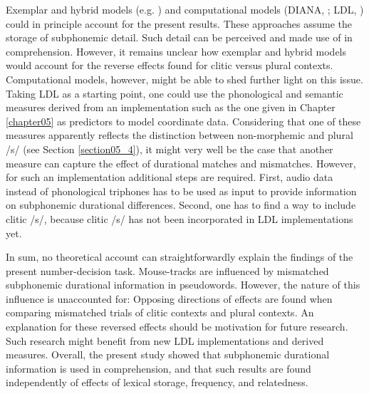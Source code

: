 Exemplar and hybrid models (e.g. \cite{Goldinger1996, Hawkins2001, Pierrehumbert2002, Hanique2013Aalders}) and computational models (DIANA, \cite{tenBosch2015, tenBosch2021}; LDL, \cite{Baayen2019}) could in principle account for the present results. These approaches assume the storage of subphonemic detail. Such detail can be perceived and made use of in comprehension. However, it remains unclear how exemplar and hybrid models would account for the reverse effects found for clitic versus plural contexts. Computational models, however, might be able to shed further light on this issue. Taking LDL as a starting point, one could use the phonological and semantic measures derived from an implementation such as the one given in Chapter \ref{chapter05} as predictors to model coordinate data. Considering that one of these measures apparently reflects the distinction between non-morphemic and plural /s/ (see Section \ref{section05_4}), it might very well be the case that another measure can capture the effect of durational matches and mismatches. However, for such an implementation additional steps are required. First, audio data instead of phonological triphones has to be used as input to provide information on subphonemic durational differences. Second, one has to find a way to include clitic /s/, because clitic /s/ has not been incorporated in LDL implementations yet. 

In sum, no theoretical account can straightforwardly explain the findings of the present number-decision task. Mouse-tracks are influenced by mismatched subphonemic durational information in pseudowords. However, the nature of this influence is unaccounted for: Opposing directions of effects are found when comparing mismatched trials of clitic contexts and plural contexts. An explanation for these reversed effects should be motivation for future research. Such research might benefit from new LDL implementations and derived measures. Overall, the present study showed that subphonemic durational information is used in comprehension, and that such results are found independently of effects of lexical storage, frequency, and relatedness. 
